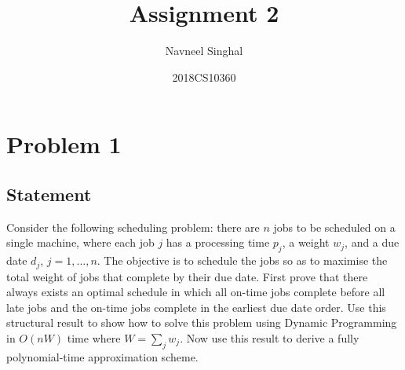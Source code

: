 \documentclass[a4paper]{article}
\title{\textbf{Assignment 2}}
\author{Navneel Singhal}
\date{2018CS10360}
\begin{document}
\maketitle
\tableofcontents

\newpage




\section{Problem 1}
\subsection{Statement}
Consider the following scheduling problem: there are $n$ jobs to be scheduled on a single machine, where each job $j$ has a processing time $p_j$, a weight $w_j$, and a due date $d_j$, $j = 1,
\ldots, n$. The objective is to schedule the jobs so as to maximise the total weight of jobs that complete by their due date. First prove that there always exists an optimal schedule in which
all on-time jobs complete before all late jobs and the on-time jobs complete in the earliest due date order. Use this structural result to show how to solve this problem using Dynamic
Programming in $O(nW)$ time where $W = \sum_j w_j$. Now use this result to derive a fully polynomial-time approximation scheme.
\end{document}
